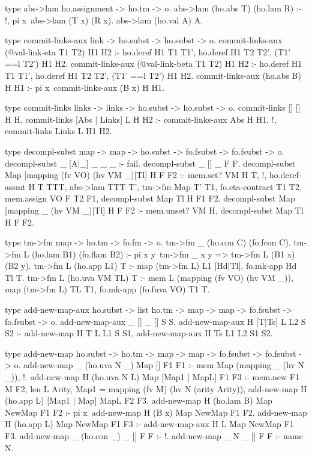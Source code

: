 \begin{elpicode}
  
  type abs->lam ho.assignment -> ho.tm -> o.
  abs->lam (ho.abs T) (ho.lam R)  :- !, pi x\ abs->lam (T x) (R x).
  abs->lam (ho.val A) A.

  type commit-links-aux link -> ho.subst -> ho.subst -> o.
  commit-links-aux (@val-link-eta T1 T2) H1 H2 :- 
    ho.deref H1 T1 T1', ho.deref H1 T2 T2',
    (T1' ==l T2') H1 H2.
  commit-links-aux (@val-link-beta T1 T2) H1 H2 :- 
    ho.deref H1 T1 T1', ho.deref H1 T2 T2',
    (T1' ==l T2') H1 H2.
  commit-links-aux (ho.abs B) H H1 :- 
    pi x\ commit-links-aux (B x) H H1.

  type commit-links links -> links -> ho.subst -> ho.subst -> o.
  commit-links [] [] H H.
  commit-links [Abs | Links] L H H2 :- 
    commit-links-aux Abs H H1, !, commit-links Links L H1 H2.

  type decompl-subst map -> map -> ho.subst -> 
    fo.fsubst -> fo.fsubst -> o.
  decompl-subst _ [A|_] _ _ _ :- fail.
  decompl-subst _ [] _ F F.
  decompl-subst Map [mapping (fv VO) (hv VM _)|Tl] H F F2 :- 
    mem.set? VM H T, !, 
    ho.deref-assmt H T TTT,
    abs->lam TTT T', tm->fm Map T' T1, 
    fo.eta-contract T1 T2, mem.assign VO F T2 F1,
    decompl-subst Map Tl H F1 F2. 
  decompl-subst Map [mapping _ (hv VM _)|Tl] H F F2 :- 
    mem.unset? VM H, decompl-subst Map Tl H F F2.

  type tm->fm map -> ho.tm -> fo.fm -> o.
  tm->fm _ (ho.con C)  (fo.fcon C).
  tm->fm L (ho.lam B1) (fo.flam B2) :- 
    pi x y\ tm->fm _ x y => tm->fm L (B1 x) (B2 y).
  tm->fm L (ho.app L1) T :- map (tm->fm L) L1 [Hd|Tl], 
    fo.mk-app Hd Tl T.
  tm->fm L (ho.uva VM TL) T :- mem L (mapping (fv VO) (hv VM _)), 
    map (tm->fm L) TL T1, fo.mk-app (fo.fuva VO) T1 T.

  type add-new-map-aux ho.subst -> list ho.tm -> map -> 
        map ->  fo.fsubst -> fo.fsubst -> o.
  add-new-map-aux _ [] _ [] S S.
  add-new-map-aux H [T|Ts] L L2 S S2 :- 
    add-new-map H T L L1 S S1, 
    add-new-map-aux H Ts L1 L2 S1 S2.

  type add-new-map ho.subst -> ho.tm -> map -> 
      map ->  fo.fsubst -> fo.fsubst -> o.
  add-new-map _ (ho.uva N _) Map [] F1 F1 :- 
    mem Map (mapping _ (hv N _)), !.
  add-new-map H (ho.uva N L) Map [Map1 | MapL] F1 F3 :-
    mem.new F1 M F2,
    len L Arity, Map1 = mapping (fv M) (hv N (arity Arity)),
    add-new-map H (ho.app L) [Map1 | Map] MapL F2 F3.
  add-new-map H (ho.lam B) Map NewMap F1 F2 :- 
    pi x\ add-new-map H (B x) Map NewMap F1 F2.
  add-new-map H (ho.app L) Map NewMap F1 F3 :- 
    add-new-map-aux H L Map NewMap F1 F3.
  add-new-map _ (ho.con _) _ [] F F :- !.
  add-new-map _ N _ [] F F :- name N.


\end{elpicode}

